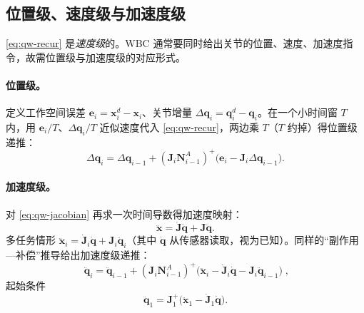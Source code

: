 \subsection{位置级、速度级与加速度级}
\label{subsec:qw-levels}

\cref{eq:qw-recur} 是\emph{速度级}的。WBC 通常要同时给出关节的位置、速度、加速度指令，故需位置级与加速度级的对应形式。

\paragraph{位置级。}
定义工作空间误差 $\boldsymbol{e}_i=\boldsymbol{x}_i^d-\boldsymbol{x}_i$、关节增量 $\Delta\boldsymbol{q}_i=\boldsymbol{q}_i^d-\boldsymbol{q}_i$。在一个小时间窗 $T$ 内，用 $\boldsymbol{e}_i/T$、$\Delta\boldsymbol{q}_i/T$ 近似速度代入 \cref{eq:qw-recur}，两边乘 $T$（$T$ 约掉）得位置级递推\cite{yu2021quadruped}：
\begin{equation}
  \Delta\boldsymbol{q}_i=\Delta\boldsymbol{q}_{i-1}+(\boldsymbol{J}_i\boldsymbol{N}_{i-1}^{A})^+\big(\boldsymbol{e}_i-\boldsymbol{J}_i\Delta\boldsymbol{q}_{i-1}\big).
  \label{eq:qw-pos-level}
\end{equation}

\paragraph{加速度级。}
对 \cref{eq:qw-jacobian} 再求一次时间导数得加速度映射：
\begin{equation}
  \ddot{\boldsymbol{x}}=\dot{\boldsymbol{J}}\dot{\boldsymbol{q}}+\boldsymbol{J}\ddot{\boldsymbol{q}}.
  \label{eq:qw-acc-map}
\end{equation}
多任务情形 $\ddot{\boldsymbol{x}}_i=\dot{\boldsymbol{J}}_i\dot{\boldsymbol{q}}+\boldsymbol{J}_i\ddot{\boldsymbol{q}}_i$（其中 $\dot{\boldsymbol{q}}$ 从传感器读取，视为已知）。同样的“副作用—补偿”推导给出加速度级递推\cite{yu2021quadruped}：
\begin{equation}
  \boxed{\;\ddot{\boldsymbol{q}}_i=\ddot{\boldsymbol{q}}_{i-1}+(\boldsymbol{J}_i\boldsymbol{N}_{i-1}^{A})^+\big(\ddot{\boldsymbol{x}}_i-\dot{\boldsymbol{J}}_i\dot{\boldsymbol{q}}-\boldsymbol{J}_i\ddot{\boldsymbol{q}}_{i-1}\big)\;},
  \label{eq:qw-acc-level}
\end{equation}
起始条件
\begin{equation}
  \ddot{\boldsymbol{q}}_1=\boldsymbol{J}_1^+\big(\ddot{\boldsymbol{x}}_1-\dot{\boldsymbol{J}}_1\dot{\boldsymbol{q}}\big).
  \label{eq:qw-acc-start}
\end{equation}

